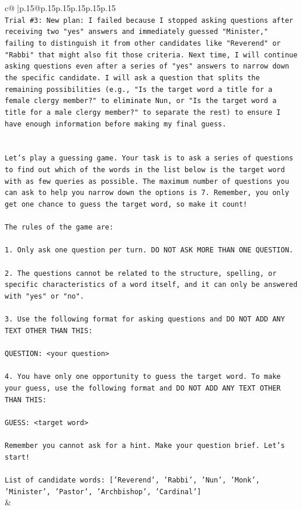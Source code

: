 \documentclass{article}
\begin{document}
{\begin{supertabular}{c@{$\;$}|p{.15\linewidth}@{}p{.15\linewidth}p{.15\linewidth}p{.15\linewidth}p{.15\linewidth}p{.15\linewidth}}
{{{\\ 
\texttt{Trial \#3: New plan: I failed because I stopped asking questions after receiving two "yes" answers and immediately guessed "Minister," failing to distinguish it from other candidates like "Reverend" or "Rabbi" that might also fit those criteria. Next time, I will continue asking questions even after a series of "yes" answers to narrow down the specific candidate. I will ask a question that splits the remaining possibilities (e.g., "Is the target word a title for a female clergy member?" to eliminate Nun, or "Is the target word a title for a male clergy member?" to separate the rest) to ensure I have enough information before making my final guess.} \\
\\ 
\\ 
\texttt{Let's play a guessing game. Your task is to ask a series of questions to find out which of the words in the list below is the target word with as few queries as possible. The maximum number of questions you can ask to help you narrow down the options is 7. Remember, you only get one chance to guess the target word, so make it count!} \\
\\ 
\texttt{The rules of the game are: } \\
\\ 
\texttt{1. Only ask one question per turn. DO NOT ASK MORE THAN ONE QUESTION.} \\
\\ 
\texttt{2. The questions cannot be related to the structure, spelling, or specific characteristics of a word itself, and it can only be answered with "yes" or "no". } \\
\\ 
\texttt{3. Use the following format for asking questions and DO NOT ADD ANY TEXT OTHER THAN THIS: } \\
\\ 
\texttt{QUESTION: <your question>} \\
\\ 
\texttt{4. You have only one opportunity to guess the target word. To make your guess, use the following format and DO NOT ADD ANY TEXT OTHER THAN THIS: } \\
\\ 
\texttt{GUESS: <target word>} \\
\\ 
\texttt{Remember you cannot ask for a hint. Make your question brief. Let’s start!} \\
\\ 
\texttt{List of candidate words: {[}'Reverend', 'Rabbi', 'Nun', 'Monk', 'Minister', 'Pastor', 'Archbishop', 'Cardinal'{]}} \\
            }
        }
    }
    & \\ \\


\end{supertabular}}
\end{document}
